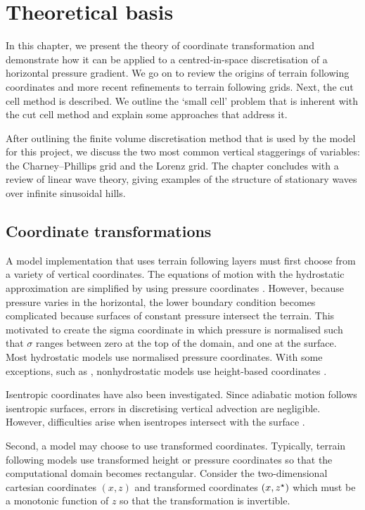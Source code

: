 \chapter{Theoretical basis}
\label{sec:theory}

In this chapter, we present the theory of coordinate transformation and demonstrate how it can be applied to a centred-in-space discretisation of a horizontal pressure gradient.  We go on to review the origins of terrain following coordinates and more recent refinements to terrain following grids.  Next, the cut cell method is described.  We outline the `small cell' problem that is inherent with the cut cell method and explain some approaches that address it.

After outlining the finite volume discretisation method that is used by the model for this project, we discuss the two most common vertical staggerings of variables: the Charney--Phillips grid and the Lorenz grid.  The chapter concludes with a review of linear wave theory, giving examples of the structure of stationary waves over infinite sinusoidal hills.

\section{Coordinate transformations}
\label{sec:theory:coord-transform}

A model implementation that uses terrain following layers must first choose from a variety of vertical coordinates.  The equations of motion with the hydrostatic approximation are simplified by using pressure coordinates \autocite{eliassen1949}.  However, because pressure varies in the horizontal, the lower boundary condition becomes complicated because surfaces of constant pressure intersect the terrain.  This motivated \textcite{phillips1957} to create the sigma coordinate in which pressure is normalised such that $\sigma$ ranges between zero at the top of the domain, and one at the surface.
Most hydrostatic models use normalised pressure coordinates.  With some exceptions, such as \textcite{xue-thorpe1991}, nonhydrostatic models use height-based coordinates \autocite{steppeler2003}.

Isentropic coordinates have also been investigated.  Since adiabatic motion follows isentropic surfaces, errors in discretising vertical advection are negligible.  However, difficulties arise when isentropes intersect with the surface \autocite{konor-arakawa1997}.

Second, a model may choose to use transformed coordinates.  Typically, terrain following models use transformed height or pressure coordinates so that the computational domain becomes rectangular.
Consider the two-dimensional cartesian coordinates $(x, z)$ and transformed coordinates $(x, {z^\star})$ which must be a monotonic function of $z$ so that the transformation is invertible.

